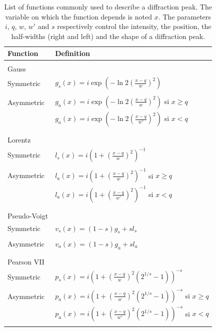 \documentclass[french,a4paper]{report}
\begin{document}
\begin{table}
\centering
\begin{tabular}{ll}
\hline
Function & Definition \\
\hline
& \\
Gauss & \\
\quad Symmetric & $g_s (x)=i \exp \left( - \ln 2 \left( \frac{x-q}{w}\right)^2\right)$ \\
& \\
\quad Asymmetric & $g_a(x)=i \exp \left( - \ln 2 \left( \frac{x-q}{w}\right)^2\right)$ si $x \geq q$ \\
& $g_a(x)=i \exp \left( - \ln 2 \left( \frac{x-q}{w'}\right)^2\right)$ si $x < q$ \\
& \\
\hline
& \\
Lorentz & \\
\quad Symmetric & $l_s(x)= i \left(   1+ \left(\frac{x-q}{w}\right)^2\right)^{-1}$ \\
& \\
\quad Asymmetric & $l_a(x)= i \left(   1+ \left(\frac{x-q}{w}\right)^2\right)^{-1}$ si $x \geq q$ \\
& $l_a(x)= i \left(  1+ \left(\frac{x-q}{w'}\right)^2\right)^{-1}$ si $x < q$ \\
& \\
\hline
& \\
Pseudo-Voigt & \\
\quad Symmetric & $v_s(x)=(1 -s) g_s+ s l_s$ \\
& \\
\quad Asymmetric & $v_a(x)=(1 -s) g_a+ s l_a$  \\
& \\
\hline
& \\
Pearson VII & \\
\quad Symmetric & $p_s(x)=i \left(   1+ \left(\frac{x-q}{w}\right)^2 \left( 2^{1/s}-1\right)\right)^{-s}$  \\
& \\
\quad Asymmetric & $p_a (x) =i \left(   1+ \left(\frac{x-q}{w}\right)^2 \left( 2^{1/s}-1\right)\right)^{-s}$ si $x \geq q$  \\
 & $p_a(x)=i \left(   1+ \left(\frac{x-q}{w'}\right)^2 \left( 2^{1/s}-1\right)\right)^{-s}$ si $x <q$  \\
 & \\
\hline
\end{tabular}
\caption{List of functions commonly used to describe a diffraction peak. The variable on which the function depends is noted $x$. The parameters $i$, $q$, $w$, $w'$ and $s$ respectively control the intensity, the position, the half-widths (right and left) and the shape of a diffraction peak.}
\label{tab_fonction}
\end{table}
\end{document}
